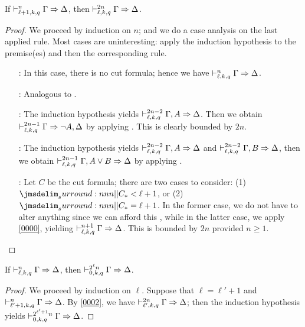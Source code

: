 \documentclass[a4paper]{article}
\begin{document}
\begin{lemma}\label{0002}
  If $\mathrel{\vdash^{n}_{\ell + 1,k,q}} \Gamma \Rightarrow \Delta$, then $\mathrel{\vdash^{2n}_{\ell,k,q}} \Gamma \Rightarrow \Delta$.
\end{lemma}
\begin{proof}
  We proceed by induction on $n$; and we do a case analysis on the last applied rule.
  Most cases are uninteresting: apply the induction hypothesis to the premise(es) and then the corresponding rule.
  \begin{itemize}
  \item[\rId:] In this case, there is no cut formula; hence we have $\mathrel{\vdash^{n}_{\ell,k,q}} \Gamma \Rightarrow \Delta$.
  \item[\rLBot:] Analogous to \rId.
  \item[\rRNot:] The induction hypothesis yields $\mathrel{\vdash^{2n - 2}_{\ell,k,q}} \Gamma, A \Rightarrow \Delta$.
    Then we obtain $\mathrel{\vdash^{2n - 1}_{\ell,k,q}} \Gamma \Rightarrow \lnot A, \Delta$ by applying \rRNot.
    This is clearly bounded by $2n$.
  \item[\rLDis:] The induction hypothesis yields $\mathrel{\vdash^{2n - 2}_{\ell,k,q}} \Gamma, A \Rightarrow \Delta$ and $\mathrel{\vdash^{2n - 2}_{\ell,k,q}} \Gamma, B \Rightarrow \Delta$, then we obtain $\mathrel{\vdash^{2n - 1}_{\ell,k,q}} \Gamma, A \vee B \Rightarrow \Delta$ by applying \rLDis.
  \item[\rCut:] Let $C$ be the cut formula; there are two cases to consider: (1) $\dRank{C} < \ell + 1$, or (2) $\dRank{C} = \ell + 1$.
    In the former case, we do not have to alter anything since we can afford this \rCut, while in the latter case, we apply \cref{0000}, yielding $\mathrel{\vdash^{n + 1}_{\ell,k,q}} \Gamma \Rightarrow \Delta$.
    This is bounded by $2n$ provided $n \geq 1$.
  \end{itemize}
\end{proof}

\begin{lemma}\label{0003}
  If $\mathrel{\vdash^{n}_{\ell,k,q}} \Gamma \Rightarrow \Delta$, then $\mathrel{\vdash^{2^{\ell}n}_{0,k,q}} \Gamma \Rightarrow \Delta$.
\end{lemma}
\begin{proof}
  We proceed by induction on $\ell$.
  Suppose that $\ell = \ell' + 1$ and $\mathrel{\vdash^{n}_{\ell' + 1,k,q}} \Gamma \Rightarrow \Delta$.
  By \cref{0002}, we have $\mathrel{\vdash^{2n}_{\ell',k,q}} \Gamma \Rightarrow \Delta$; then the induction hypothesis yields $\mathrel{\vdash^{2^{\ell' + 1}n}_{0,k,q}} \Gamma \Rightarrow \Delta$.
\end{proof}
\end{document}
